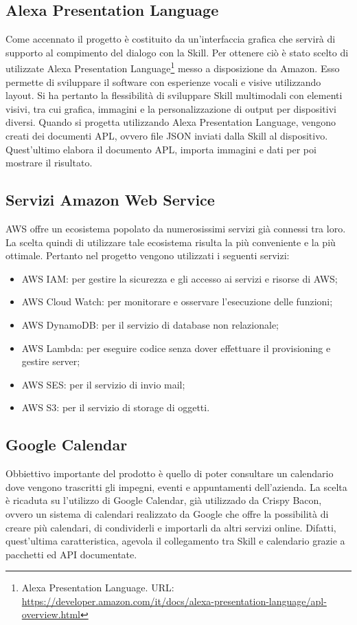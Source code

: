 \subsection{Alexa Presentation Language}
Come accennato il progetto è costituito da un'interfaccia grafica che servirà di supporto al compimento del dialogo con la Skill. Per ottenere ciò è stato scelto di utilizzate Alexa Presentation Language\footnote{Alexa Presentation Language. URL: \href{https://developer.amazon.com/it/docs/alexa-presentation-language/apl-overview.html}{https://developer.amazon.com/it/docs/alexa-presentation-language/apl-overview.html}} messo a disposizione da Amazon. Esso permette di sviluppare il software con esperienze vocali e visive utilizzando layout. Si ha pertanto la flessibilità di sviluppare Skill multimodali con elementi visivi, tra cui grafica, immagini e la personalizzazione di output per dispositivi diversi. Quando si progetta utilizzando Alexa Presentation Language, vengono creati dei documenti APL, ovvero file JSON inviati dalla Skill al dispositivo. Quest'ultimo elabora il documento APL, importa immagini e dati per poi mostrare il risultato.

\subsection{Servizi Amazon Web Service}
\label{serivizi-aws}
AWS offre un ecosistema popolato da numerosissimi servizi già connessi tra loro. La scelta quindi di utilizzare tale ecosistema risulta la più conveniente e la più ottimale. Pertanto nel progetto vengono utilizzati i seguenti servizi:
\begin{itemize}
    \item AWS IAM: per gestire la sicurezza e gli accesso ai servizi e risorse di AWS;
    \item AWS Cloud Watch: per monitorare e osservare l'esecuzione delle funzioni;
    \item AWS DynamoDB: per il servizio di database non relazionale;
    \item AWS Lambda: per eseguire codice senza dover effettuare il provisioning e gestire server;
    \item AWS SES: per il servizio di invio mail;
    \item AWS S3: per il servizio di storage di oggetti.
\end{itemize}

\subsection{Google Calendar}
Obbiettivo importante del prodotto è quello di poter consultare un calendario dove vengono trascritti gli impegni, eventi e appuntamenti dell'azienda. La scelta è ricaduta su l'utilizzo di Google Calendar, già utilizzado da Crispy Bacon, ovvero un sistema di calendari realizzato da Google che offre la possibilità di creare più calendari, di condividerli e importarli da altri servizi online. Difatti, quest'ultima caratteristica, agevola il collegamento tra Skill e calendario grazie a pacchetti ed API documentate.

